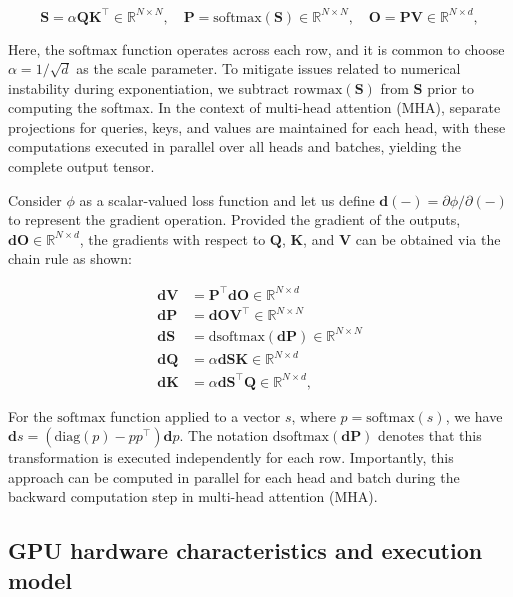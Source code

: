 \begin{equation*}
  \mathbf{S} = \alpha \mathbf{Q} \mathbf{K}^\top \in \mathbb{R}^{N \times N}, \quad \mathbf{P} = \mathrm{softmax}(\mathbf{S}) \in \mathbb{R}^{N \times N}, \quad \mathbf{O} = \mathbf{P}\mathbf{V} \in \mathbb{R}^{N \times d},
\end{equation*}

Here, the $\mathrm{softmax}$ function operates across each row, and it is common to choose $\alpha = 1/\sqrt{d}$ as the scale parameter. To mitigate issues related to numerical instability during exponentiation, we subtract $\mathrm{rowmax}(\mathbf{S})$ from $\mathbf{S}$ prior to computing the softmax. In the context of multi-head attention (MHA), separate projections for queries, keys, and values are maintained for each head, with these computations executed in parallel over all heads and batches, yielding the complete output tensor.

Consider $\phi$ as a scalar-valued loss function and let us define $\mathbf{d}(-) = \partial \phi / \partial (-)$ to represent the gradient operation. Provided the gradient of the outputs, $\mathbf{dO} \in \mathbb{R}^{N \times d}$, the gradients with respect to $\mathbf{Q}$, $\mathbf{K}$, and $\mathbf{V}$ can be obtained via the chain rule as shown:

\begin{align*}
  \mathbf{dV} &= \mathbf{P}^\top \mathbf{dO} \in \mathbb{R}^{N \times d} \\
  \mathbf{dP} &= \mathbf{dO} \mathbf{V}^\top \in \mathbb{R}^{N \times N} \\
  \mathbf{dS} &= \mathrm{dsoftmax} (\mathbf{dP}) \in \mathbb{R}^{N \times N} \\
  \mathbf{dQ} &= \alpha \mathbf{dS} \mathbf{K} \in \mathbb{R}^{N \times d} \\
  \mathbf{dK} &= \alpha \mathbf{dS}^\top \mathbf{Q} \in \mathbb{R}^{N \times d},
\end{align*}

For the $\mathrm{softmax}$ function applied to a vector $s$, where $p = \mathrm{softmax}(s)$, we have $\mathbf{d}s = (\mathrm{diag}(p) - p p^\top)\mathbf{d}p$. The notation $\mathrm{dsoftmax}(\mathbf{dP})$ denotes that this transformation is executed independently for each row. Importantly, this approach can be computed in parallel for each head and batch during the backward computation step in multi-head attention (MHA).

\subsection{GPU hardware characteristics and execution model}
\label{subsec:hardware}

